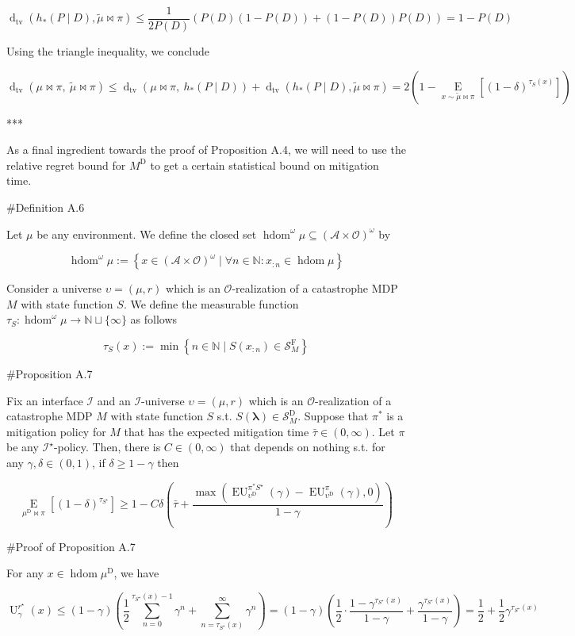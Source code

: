 \documentclass[a4paper]{article}
\newcommand{\AP}[1]{\left(#1\right)}
\newcommand{\AB}[1]{\left[#1\right]}
\newcommand{\AC}[1]{\left\{#1\right\}}
\newcommand{\Ea}[2]{\underset{#1}{\operatorname{E}}\AB{#2}}
\newcommand{\Dtva}[1]{\operatorname{d}_{\text{tv}}\AP{#1}}
\newcommand{\Nats}{\mathbb{N}}
\newcommand{\Estr}{\boldsymbol{\lambda}}
\newcommand{\Ob}{\mathcal{O}}
\newcommand{\A}{\mathcal{A}}
\newcommand{\St}{\mathcal{S}}
\newcommand{\In}{\mathcal{I}}
\DeclareMathOperator{\HD}{hdom}
\newcommand{\RMD}{\mathrm{D}}
\newcommand{\RMF}{\mathrm{F}}
\newcommand{\SF}{\St^{\RMF}}
\newcommand{\SD}{\St^{\RMD}}
\newcommand{\MD}{M^{\RMD}}
\newcommand{\Ut}{\operatorname{U}}
\newcommand{\EU}{\operatorname{EU}}
\begin{document}
$$\Dtva{h_*\AP{P \mid D},\tilde{\mu}\bowtie\pi} \leq \frac{1}{2P(D)}\AP{P(D)\AP{1-P(D)} + \AP{1-P(D)}P(D)}=1-P(D)$$

Using the triangle inequality, we conclude

$$\Dtva{\mu\bowtie\pi,\ \tilde{\mu}\bowtie\pi}\leq\Dtva{\mu\bowtie\pi,\ h_*\AP{P \mid D}}+\Dtva{h_*\AP{P \mid D},\tilde{\mu}\bowtie\pi}=2\AP{1-\Ea{x\sim\tilde{\mu}\bowtie\pi}{\AP{1-\delta}^{\tau_S(x)}}}$$

***

As a final ingredient towards the proof of Proposition A.4, we will need to use the relative regret bound for $\MD$ to get a certain statistical bound on mitigation time.

\#Definition A.6

Let $\mu$ be any environment. We define the closed set $\HD^\omega\mu \subseteq (\A \times \Ob)^\omega$ by

$$\HD^\omega\mu := \AC{x \in (\A \times \Ob)^\omega \mid \forall n \in \Nats: x_{:n} \in \HD{\mu}}$$

Consider a universe $\upsilon=(\mu,r)$ which is an $\Ob$-realization of a catastrophe MDP $M$ with state function $S$. We define the measurable function $\tau_S: \HD^\omega{\mu} \rightarrow \Nats \sqcup \{\infty\}$ as follows

$$\tau_S(x) := \min\AC{n \in \Nats \mid S\AP{x_{:n}} \in \SF_M}$$

\#Proposition A.7

Fix an interface $\In$ and an $\In$-universe $\upsilon=(\mu,r)$ which is an $\Ob$-realization of a catastrophe MDP $M$ with state function $S$ s.t. $S(\Estr)\in\SD_M$. Suppose that $\pi^*$ is a mitigation policy for $M$ that has the expected mitigation time $\bar{\tau}\in(0,\infty)$. Let $\pi$ be any $\In^\star$-policy. Then, there is $C\in(0,\infty)$ that depends on nothing s.t. for any $\gamma,\delta\in(0,1)$, if $\delta \geq 1-\gamma$ then

$$\Ea{\mu^\RMD\bowtie\pi}{(1-\delta)^{\tau_{S^\star}}} \geq 1 - C\delta\AP{\bar{\tau}+\frac{\max\AP{\EU_{\upsilon^{\RMD}}^{\pi^* S^\star}(\gamma)-\EU_{\upsilon^{\RMD}}^{\pi}(\gamma),0}}{1-\gamma}}$$

\#Proof of Proposition A.7

For any $x \in \HD{\mu^\RMD}$, we have

$$\Ut^{r^\star}_\gamma(x) \leq (1-\gamma)\AP{\frac{1}{2}\sum_{n=0}^{\tau_{S^\star}(x)-1}{\gamma^n} + \sum_{n=\tau_{S^\star}(x)}^\infty \gamma^n} = (1-\gamma)\AP{\frac{1}{2} \cdot \frac{1 - \gamma^{\tau_{S^\star}(x)}}{1-\gamma}+\frac{\gamma^{\tau_{S^\star}(x)}}{1-\gamma}}=\frac{1}{2}+\frac{1}{2}\gamma^{\tau_{S^\star}(x)}$$
\end{document}
